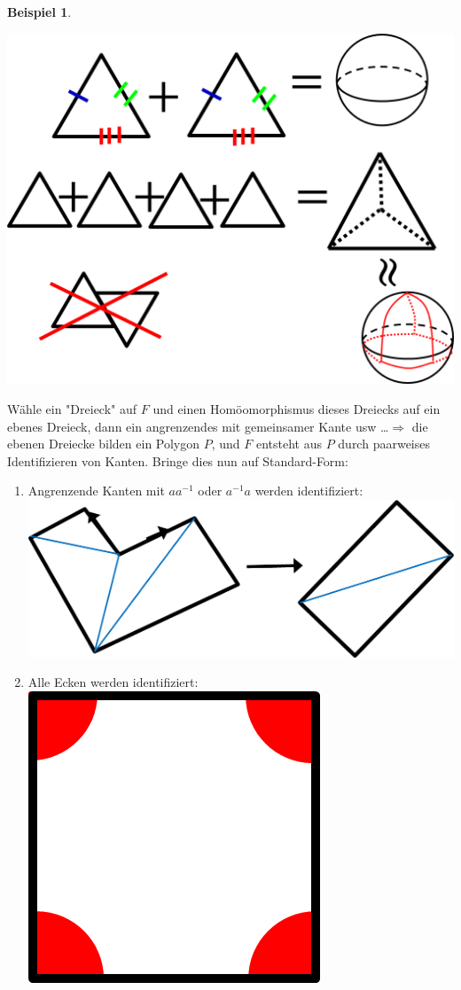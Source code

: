 \documentclass[a4paper,11pt,notitlepage]{report}
\theoremstyle{definition}
\newtheorem{example}{Beispiel}[chapter]
\begin{document}
\begin{example}
	\begin{center}
		\includegraphics[scale=0.5]{images/2012_01_12_Bild3.png}
	\end{center}
	Wähle ein "Dreieck" auf $F$ und einen Homöomorphismus dieses Dreiecks auf ein ebenes Dreieck, dann ein angrenzendes mit gemeinsamer Kante usw \ldots $\Rightarrow$ die ebenen Dreiecke bilden ein Polygon $P$, und $F$ entsteht aus $P$ durch paarweises Identifizieren von Kanten. Bringe dies nun auf Standard-Form:
	\begin{enumerate}
		\item Angrenzende Kanten mit $aa^{-1}$ oder $a^{-1}a$ werden identifiziert:  \newline
		\includegraphics[scale=0.5]{images/2012_01_12_Bild4a.png}
		\item Alle Ecken werden identifiziert: \newline
		\includegraphics[scale=0.5]{images/2012_01_12_Bild4b.png}

\end{enumerate}
\end{example}
\end{document}
